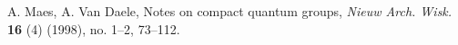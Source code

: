 \documentclass[11pt]{article}
\DeclareMathOperator{\id}{id}
\newcommand{\Grt}[3]{#1{\tiny {\begin{pmatrix} #2\\#3\end{pmatrix}}}}
\newcommand{\UnitC}[2]{\Grt{\mathbf{1}}{#1}{#2}}
\newtheorem{Prop}[Theorem]{Proposition}
\theoremstyle{definition}
\numberwithin{equation}{section}
\begin{document}
\begin{thebibliography}{00}

 A. Maes, A. Van Daele, Notes on compact quantum groups, \emph{Nieuw Arch. Wisk.} \textbf{16} (4) (1998), no. 1--2, 73--112. 

\end{thebibliography}
\end{document}
